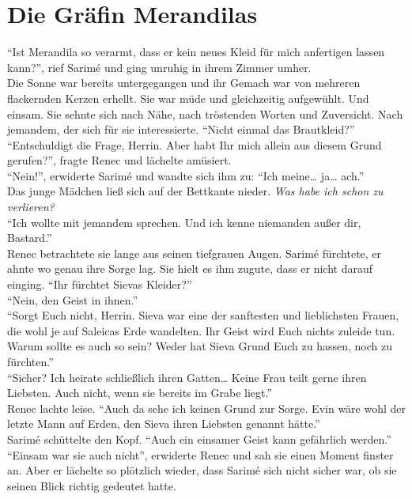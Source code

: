 \chapter{Die Gräfin Merandilas}

``Ist Merandila so verarmt, dass er kein neues Kleid für mich anfertigen lassen kann?'', rief 
Sarimé und ging unruhig in ihrem Zimmer umher. \\ 
Die Sonne war bereits untergegangen und ihr Gemach war von mehreren flackernden Kerzen erhellt. Sie 
war müde und gleichzeitig aufgewühlt. Und einsam. Sie sehnte sich nach Nähe, nach tröstenden Worten 
und Zuversicht. Nach jemandem, der sich für sie interessierte. ``Nicht einmal das Brautkleid?''\\
``Entschuldigt die Frage, Herrin. Aber habt Ihr mich allein aus diesem Grund gerufen?'', fragte 
Renec und lächelte amüsiert.\\
``Nein!'', erwiderte Sarimé und wandte sich ihm zu: ``Ich meine… ja… ach.''\\
Das junge Mädchen ließ sich auf der Bettkante nieder. \textit{Was habe ich schon zu verlieren?} \\
``Ich wollte mit jemandem sprechen. Und ich kenne niemanden außer dir, Bastard.''\\
Renec betrachtete sie lange aus seinen tiefgrauen Augen. Sarimé fürchtete, er ahnte wo genau ihre 
Sorge lag. Sie hielt es ihm zugute, dass er nicht darauf einging. ``Ihr fürchtet Sievas Kleider?''\\
``Nein, den Geist in ihnen.''\\
``Sorgt Euch nicht, Herrin. Sieva war eine der sanftesten und lieblichsten Frauen, die wohl je auf 
Saleicas Erde wandelten. Ihr Geist wird Euch nichts zuleide tun. Warum sollte es auch so sein? 
Weder hat Sieva Grund Euch zu hassen, noch zu fürchten.''\\
``Sicher? Ich heirate schließlich ihren Gatten… Keine Frau teilt gerne ihren Liebsten. Auch nicht, 
wenn sie bereits im Grabe liegt.''\\
Renec lachte leise. ``Auch da sehe ich keinen Grund zur Sorge. Evin wäre wohl der letzte Mann auf 
Erden, den Sieva ihren Liebsten genannt hätte.''\\
Sarimé schüttelte den Kopf. ``Auch ein einsamer Geist kann gefährlich werden.''\\
``Einsam war sie auch nicht'', erwiderte Renec und sah sie einen Moment finster an. Aber er 
lächelte so plötzlich wieder, dass Sarimé sich nicht sicher war, ob sie seinen Blick richtig 
gedeutet hatte.
